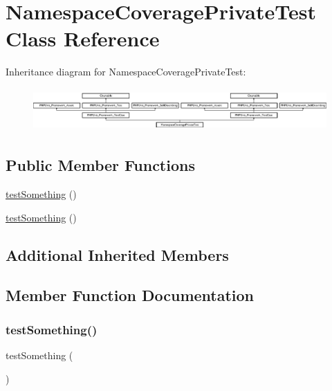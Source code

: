 \hypertarget{class_namespace_coverage_private_test}{}\section{Namespace\+Coverage\+Private\+Test Class Reference}
\label{class_namespace_coverage_private_test}
Inheritance diagram for Namespace\+Coverage\+Private\+Test\+:\begin{figure}[H]
\begin{center}
\leavevmode
\includegraphics[height=1.651917cm]{class_namespace_coverage_private_test}
\end{center}
\end{figure}
\subsection*{Public Member Functions}
\begin{DoxyCompactItemize}
\item 
\mbox{\hyperlink{class_namespace_coverage_private_test_a0fc4e17369bc9607ebdd850d9eda8167}{test\+Something}} ()
\item 
\mbox{\hyperlink{class_namespace_coverage_private_test_a0fc4e17369bc9607ebdd850d9eda8167}{test\+Something}} ()
\end{DoxyCompactItemize}
\subsection*{Additional Inherited Members}


\subsection{Member Function Documentation}
\mbox{\label{class_namespace_coverage_private_test_a0fc4e17369bc9607ebdd850d9eda8167}} 
\subsubsection{\texorpdfstring{test\+Something()}{testSomething()}\hspace{0.1cm}{\footnotesize\ttfamily [1/2]}}
{\footnotesize\ttfamily test\+Something (\begin{DoxyParamCaption}{ }\end{DoxyParamCaption})}

